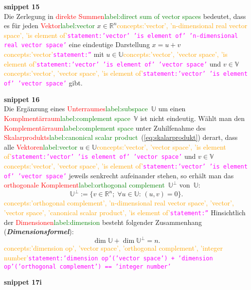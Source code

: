 \documentclass[a4paper,twoside,english,ngerman,deutsch,german,sectrefs,envcountsame,envcountchap]{svmono}
\newcommand{\setref}[2]{\textcolor{red}{#1}\textcolor{green}{#2}}
\newcommand{\snippet}[1]{\textbf{snippet #1}\\}
\newcommand{\eqnote}[2]{\textcolor{orange}{#1}\textcolor{magenta}{\texttt{#2}}}
\begin{document}
\snippet{15}
Die Zerlegung in \setref{direkte Summen}{label:direct sum of vector spaces} bedeutet, dass es für jeden \setref{Vektor}{label:vector} $x\in{\mathbb{R}}^{n}$\eqnote{concepts:'vector', 'n-dimensional real vector space', 'is element of'}{statement:'vector' 'is element of' 'n-dimensional real vector space'} eine eindeutige Darstellung $x=u+v$\eqnote{concepts:'vector'}{statement:''} mit $u\in\mathbb{U}$\eqnote{concepts:'vector', 'vector space', 'is element of'}{statement:'vector' 'is element of' 'vector space'} und $v\in\mathbb{V}$\eqnote{concepts:'vector', 'vector space', 'is element of'}{statement:'vector' 'is element of' 'vector space'} gibt.

\snippet{16}
Die Ergänzung eines \setref{Unterraumes}{label:subspace}~$\mathbb{U}$ um einen \setref{Komplmentärraum}{label:complement space}~$\mathbb{V}$ ist nicht eindeutig. Wählt man den \setref{Komplementärraum}{label:complement space} unter Zuhilfenahme des \setref{Skalarprodukts}{label:canonical scalar product}~(\eqref{eq:skalarprodukt}) derart, dass alle \setref{Vektoren}{label:vector} $u\in\mathbb{U}$\eqnote{concepts:'vector', 'vector space', 'is element of'}{statement:'vector' 'is element of' 'vector space'} und $v\in\mathbb{V}$\eqnote{concepts:'vector', 'vector space', 'is element of'}{statement:'vector' 'is element of' 'vector space'} jeweils senkrecht aufeinander stehen, so erhält man das \setref{orthogonale Komplement}{label:orthogonal complement}~$\mathbb{U}^{\perp}$ von~$\mathbb{U}$:
\begin{equation}
\mathbb{U}^{\perp}:=\{v\in{\mathbb{R}}^{n};\;\forall u\in\mathbb{U}:\,(u,v)=0\}.\label{eq:ortho-komplement}
\end{equation}\eqnote{concepts:'orthogonal complement', 'n-dimensional real vector space', 'vector', 'vector space', 'canonical scalar product', 'is element of'}{statement:''}
Hinsichtlich der \setref{Dimensionen}{label:dimension} besteht folgender Zusammenhang (\textbf{\em Dimensionsformel}):
\begin{equation}
\dim\mathbb{U}+\dim\mathbb{U}^{\perp}=n.\label{eq:dimensionsformel-ortho-kompl}
\end{equation}\eqnote{concepts:'dimension op', 'vector space', 'orthogonal complement', 'integer number'}{statement:'dimension op'('vector space') + 'dimension op'('orthogonal complement') == 'integer number'}

\snippet{17i}
\end{document}
